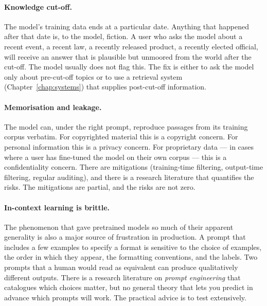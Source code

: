 \paragraph{Knowledge cut-off.} The model's training data ends
at a particular date. Anything that happened after that date
is, to the model, fiction. A user who asks the model about a
recent event, a recent law, a recently released product, a
recently elected official, will receive an answer that is
plausible but unmoored from the world after the cut-off. The
model usually does not flag this. The fix is either to ask the
model only about pre-cut-off topics or to use a retrieval
system (Chapter~\ref{chap:systems}) that supplies post-cut-off information.

\paragraph{Memorisation and leakage.} The model can, under the
right prompt, reproduce passages from its training corpus
verbatim. For copyrighted material this is a copyright concern.
For personal information this is a privacy concern. For
proprietary data --- in cases where a user has fine-tuned the
model on their own corpus --- this is a confidentiality
concern. There are mitigations (training-time filtering,
output-time filtering, regular auditing), and there is a
research literature that quantifies the risks. The mitigations
are partial, and the risks are not zero.

\paragraph{In-context learning is brittle.} The phenomenon that
gave pretrained models so much of their apparent generality is
also a major source of frustration in production. A prompt that
includes a few examples to specify a format is sensitive to the
choice of examples, the order in which they appear, the
formatting conventions, and the labels. Two prompts that a
human would read as equivalent can produce qualitatively
different outputs. There is a research literature on
\emph{prompt engineering} that catalogues which choices matter,
but no general theory that lets you predict in advance which
prompts will work. The practical advice is to test extensively.

